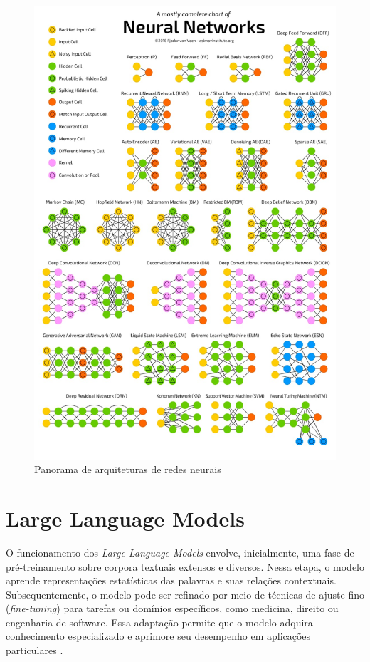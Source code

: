 \begin{figure}[!htbp]
  \centering
  \includegraphics[width=1\textwidth]{imgs/neural_networks.jpeg}
  \caption{Panorama de arquiteturas de redes neurais \cite{asimov2017}}
  \label{fig:nnzoo}
\end{figure}

\FloatBarrier
\section{Large Language Models}

O funcionamento dos \textit{Large Language Models} envolve, inicialmente, uma fase de pré-treinamento sobre corpora textuais extensos e diversos. Nessa etapa, o modelo aprende representações estatísticas das palavras e suas relações contextuais. Subsequentemente, o modelo pode ser refinado por meio de técnicas de ajuste fino (\textit{fine-tuning}) para tarefas ou domínios específicos, como medicina, direito ou engenharia de software. Essa adaptação permite que o modelo adquira conhecimento especializado e aprimore seu desempenho em aplicações particulares \cite{jelodar2025, ouyang2023}.

